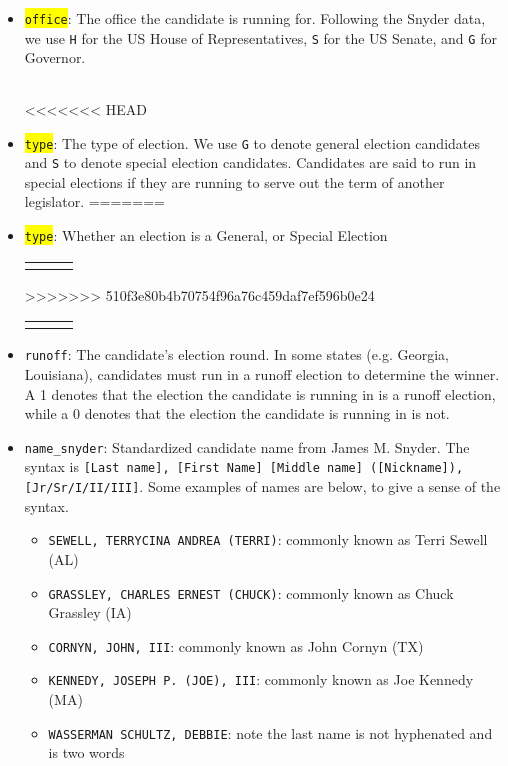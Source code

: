 \documentclass[12pt]{article}
\begin{document}
\begin{itemize}[leftmargin=*]

\item \colorbox{yellow}{\texttt{office}}: The office the candidate is running for. Following the Snyder data, we use \texttt{H} for the US House of Representatives, \texttt{S} for the US Senate, and \texttt{G} for Governor. 

    \begin{tabularx}{\linewidth}{C}
    
    \end{tabularx}
			
<<<<<<< HEAD
\item \colorbox{yellow}{\texttt{type}}: The type of election. We use \texttt{G} to denote general election candidates and \texttt{S} to denote special election candidates. Candidates are said to run in special elections if they are running to serve out the term of another legislator. 
=======
\item \colorbox{yellow}{\texttt{type}}: Whether an election is a General, or Special Election

\begin{tabularx}{\linewidth}{CCC}
 &  & 
\end{tabularx}
>>>>>>> 510f3e80b4b70754f96a76c459daf7ef596b0e24

\begin{tabularx}{\linewidth}{CCC}
 &  & 
\end{tabularx}

\item \texttt{runoff}: The candidate's election round. In some states (e.g. Georgia, Louisiana), candidates must run in a runoff election to determine the winner. A 1 denotes that the election the candidate is running in is a runoff election, while a 0 denotes that the election the candidate is running in is not.

\item \texttt{name\_snyder}: Standardized candidate name from James M. Snyder.  The syntax is \texttt{[Last name], [First Name] [Middle name] ([Nickname]), [Jr/Sr/I/II/III]}.  Some examples of names are below, to give a sense of the syntax.

\begin{itemize}
	\item[] \texttt{SEWELL, TERRYCINA ANDREA (TERRI)}: commonly known as Terri Sewell (AL)
	\item[] \texttt{GRASSLEY, CHARLES ERNEST (CHUCK)}: commonly known as Chuck Grassley (IA)
	\item[] \texttt{CORNYN, JOHN, III}: commonly known as John Cornyn (TX)
	\item[] \texttt{KENNEDY, JOSEPH P. (JOE), III}: commonly known as Joe Kennedy (MA)
	\item[] \texttt{WASSERMAN SCHULTZ, DEBBIE}: note the last name is not hyphenated and is two words
\end{itemize}


\end{itemize}
\end{document}
